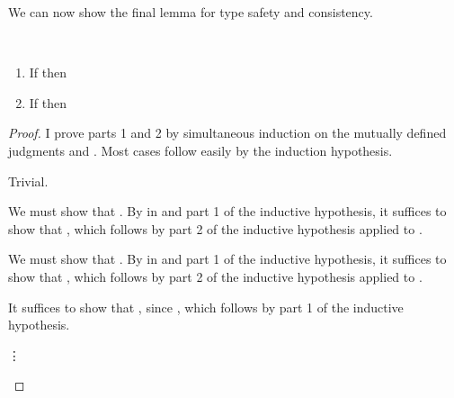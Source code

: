 We can now show the final lemma for type safety and consistency.
\begin{lemma}
  ~
  \label{lem:abs-cc:m:type-pres}
  \begin{enumerate}
    \item If \im{\twf{\tlenv}} then \im{\swf{\absccmodel{\tlenv}}}
    \item If \im{\ttyjudg{\tlenv}{\te}{\tA}} then \im{\styjudg{\absccmodel{\tlenv}}{\absccmodel{\te}}{\absccmodel{\tA}}}
  \end{enumerate}
\end{lemma}
\begin{proof}
  I prove parts 1 and 2 by simultaneous induction on the mutually defined judgments
  \im{\twf{\tlenv}} and \im{\ttyjudg{\tlenv}{\te}{\tA}}.
  Most cases follow easily by the induction hypothesis.
  \begin{proofcases}
  \item {}

    Trivial.

  \item {}

    We must show that \im{\swf{\absccmodel{(\tlenv,\tx = \te)}}}.
    By  in \slang and part 1 of the inductive hypothesis, it
    suffices to show that \im{\styjudg{\absccmodel{\tlenv}}{\absccmodel{\te}}{\absccmodel{\tA}}},
    which follows by part 2 of the inductive hypothesis applied to
    \im{\ttyjudg{\tlenv}{\te}{\tA}}.

  \item {}

    We must show that \im{\swf{\absccmodel{(\tlenv,\tx : \tA)}}}.
    By  in \slang and part 1 of the inductive hypothesis,
    it suffices to show that \im{\styjudg{\absccmodel{\tlenv}}{\absccmodel{\tA}}{\absccmodel{\tU}}},
    which follows by part 2 of the inductive hypothesis applied to
    \im{\ttyjudg{\tlenv}{\tA}{\tU}}.

  \item {}

    It suffices to show that \im{\swf{\absccmodel{\tlenv}}}, since \im{\absccmodel{\tpropty} =
      \spropty}, which follows by part 1 of the inductive hypothesis.

  \item[\vdots]
  \item {}


\end{proofcases}
\end{proof}
